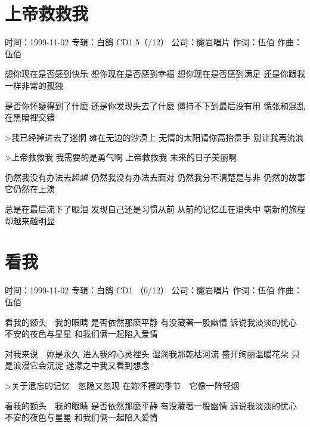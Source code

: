 \documentclass[UTF8,a4paper,oneside,twocolumn,12pt]{ctexbook}
\newcommand{\infopair}[2]{\textbullet #1：#2}
\newcommand{\zc}[1][伍佰]{\infopair{作词}{#1}}
\newcommand{\zq}[1][伍佰]{\infopair{作曲}{#1}}
\newcommand{\zj}[1]{\infopair{专辑}{#1}}
\newcommand{\sj}[1]{\infopair{时间}{#1}}
\newcommand{\gs}[1]{\infopair{公司}{#1}}
\newenvironment{info}{\begin{flushleft}\kaishu
	}
	{\end{flushleft}\normalsize\yahei\par}
\newenvironment{lyric}{
	}
{}
\begin{document}
\section{上帝救救我}
\begin{info}
	\sj{1999-11-02}
	\zj{白鸽 CD1 5（/12）}
	\gs{魔岩唱片}
	\zc
	\zq
\end{info}
\begin{lyric}
	想你现在是否感到快乐
	想你现在是否感到幸福
	想你现在是否感到满足
	还是你跟我一样非常的孤独

	是否你怀疑得到了什麽
	还是你发现失去了什麽
	僵持不下到最后没有用
	慌张和混乱在黑暗裡交错

	>我已经掉进去了迷惘
	瘫在无边的沙漠上
	无情的太阳请你高抬贵手
	别让我再流浪

	>上帝救救我
	我需要的是勇气啊
	上帝救救我
	未来的日子美丽啊

	仍然我没有办法去超越
	仍然我没有办法去面对
	仍然我分不清楚是与非
	仍然的故事它仍然在上演

	总是在最后流下了眼泪
	发现自己还是习惯从前
	从前的记忆正在消失中
	崭新的旅程却越来越明显
\end{lyric}

\section{看我}
\begin{info}
	\sj{1999-11-02}
	\zj{白鸽 CD1 （6/12）}
	\gs{魔岩唱片}
	\zc
	\zq
\end{info}
\begin{lyric}
	看我的额头　我的眼睛
	是否依然那麽平静
	有没藏著一股幽情
	诉说我淡淡的忧心
	不安的夜色与星星
	和我们俩一起陷入爱情

	对我来说　妳是永久
	进入我的心灵裡头
	湿润我那乾枯河流
	盛开绚丽温暖花朵
	只是浪漫它会沉淀
	迷濛之中我又看到想念

	>关于遗忘的记忆　忽隐又忽现
	在妳怀裡的季节　它像一阵轻烟

	看我的额头　我的眼睛
	是否依然那麽平静
	有没藏著一股幽情
	诉说我淡淡的忧心
	不安的夜色与星星
	和我们俩一起陷入爱情
\end{lyric}
\end{document}
